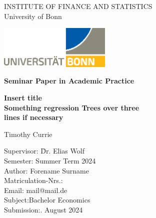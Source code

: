 \thispagestyle{empty}

\begin{center}

\vspace*{-8mm}

{\LARGE INSTITUTE OF FINANCE AND STATISTICS\\[1mm]}
\large University of Bonn\\

\vspace*{1cm}

\includegraphics[width=0.4\textwidth]{./Graphics/UNI_Bonn_Logo_Standard_RZ.eps}

\vspace*{1cm}

{\Large \textbf{Seminar Paper in Academic Practice}}\\ 

\vspace{1cm}

{\Large \textbf{Insert title}}\\ 
\vspace*{1mm}
{\Large \textbf{Something regression Trees over three}}\\ 
\vspace*{1mm}
{\Large \textbf{lines if necessary}}\\

\vspace{1.5cm}

{\LARGE Timothy Currie}\\[15mm]

\parbox{120mm}{
\begin{large}
\begin{tabbing}
Supervisor: \hspace{1.8cm} \= Dr. Elias Wolf\\[1.5mm]
Semester:\> Summer Term 2024\\[1.5mm]
Author:\> Forename Surname\\[1.5mm] %
Matriculation-Nrs.:\\[1.5mm]
Email:\> mail@mail.de\\[1.5mm]
Subject:\>Bachelor Economics\\[1.5mm]
Submission:. August 2024\\[1.5mm]
\end{tabbing}
\end{large}
}

\end{center}
\clearpage{\pagestyle{empty}\cleardoublepage}
